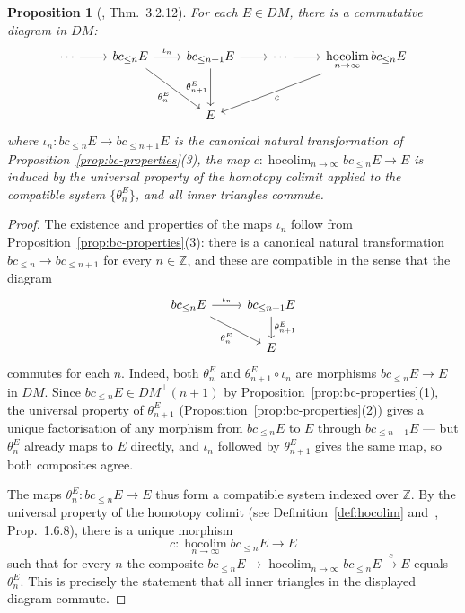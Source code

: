 \documentclass[12pt,a4paper]{article}
\newtheorem{proposition}[theorem]{Proposition}
\theoremstyle{definition}
\newcommand{\hocolim}{\operatorname*{hocolim}}
\newcommand{\Z}{\mathbb{Z}}
\begin{document}
\begin{proposition}[\cite{Pel17}, Thm.\ 3.2.12]\label{prop:orthogonal-tower}
For each $E\in DM$, there is a commutative diagram in $DM$:
\[
\begin{tikzcd}[column sep=2.2em, row sep=2.6em]
  \cdots \ar[r]
    & bc_{\leq n}E \ar[r,"\iota_n"] \ar[dr,"\theta_n^E"']
    & bc_{\leq n+1}E \ar[r] \ar[d,"\theta_{n+1}^E"']
    & \cdots \ar[r]
    & \displaystyle\hocolim_{n\to\infty}bc_{\leq n}E \ar[dll,"c"]
  \\
    &
    & E
    &
    &
\end{tikzcd}
\]
where $\iota_n:bc_{\leq n}E\to bc_{\leq n+1}E$ is the canonical natural
transformation of Proposition~\textup{\ref{prop:bc-properties}(3)}, the map
$c:\hocolim_{n\to\infty}bc_{\leq n}E\to E$ is induced by the universal property of
the homotopy colimit applied to the compatible system $\{\theta_n^E\}$, and all
inner triangles commute.
\end{proposition}
\begin{proof}
The existence and properties of the maps $\iota_n$ follow from
Proposition~\ref{prop:bc-properties}(3): there is a canonical natural transformation
$bc_{\leq n}\to bc_{\leq n+1}$ for every $n\in\Z$, and these are compatible in the
sense that the diagram
\[
\begin{tikzcd}
  bc_{\leq n}E \ar[r,"\iota_n"] \ar[dr,"\theta_n^E"']
    & bc_{\leq n+1}E \ar[d,"\theta_{n+1}^E"] \\
    & E
\end{tikzcd}
\]
commutes for each $n$.  Indeed, both $\theta_n^E$ and $\theta_{n+1}^E\circ\iota_n$
are morphisms $bc_{\leq n}E\to E$ in $DM$.  Since $bc_{\leq n}E\in DM^\perp(n+1)$
by Proposition~\ref{prop:bc-properties}(1), the universal property of
$\theta_{n+1}^E$ (Proposition~\ref{prop:bc-properties}(2)) gives a unique factorisation
of any morphism from $bc_{\leq n}E$ to $E$ through $bc_{\leq n+1}E$ — but
$\theta_n^E$ already maps to $E$ directly, and $\iota_n$ followed by $\theta_{n+1}^E$
gives the same map, so both composites agree.

The maps $\theta_n^E:bc_{\leq n}E\to E$ thus form a compatible system indexed over
$\Z$.  By the universal property of the homotopy colimit
(see Definition~\ref{def:hocolim} and~\cite{Nee01}, Prop.\ 1.6.8), there is a
unique morphism
\[
  c:\hocolim_{n\to\infty}bc_{\leq n}E\longrightarrow E
\]
such that for every $n$ the composite
$bc_{\leq n}E\to\hocolim_{n\to\infty}bc_{\leq n}E\xrightarrow{c} E$
equals $\theta_n^E$.  This is precisely the statement that all inner triangles in the
displayed diagram commute.
\end{proof}
\end{document}
